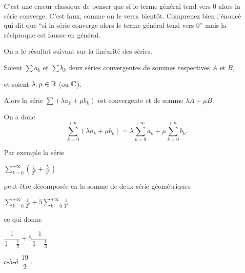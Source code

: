 \change
C'est une erreur classique de penser que si le terme
général tend vers $0$ alors la série converge. C'est faux, comme on le verra
bientôt. Comprenez bien l'énoncé qui dit que ``si la série converge alors
le terme général tend vers $0$'' mais la réciproque est fausse en général.


\diapo

On a le résultat suivant sur la linéarité des séries.

Soient $\sum a_k$ et $\sum b_k$ deux séries convergentes de sommes respectives $A$ et $B$, 

et soient $\lambda, \mu \in \mathbb{R}$ (ou $\mathbb{C}$).

\change
Alors la série $\sum (\lambda a_k+\mu b_k)$ est convergente et de somme $\lambda A+\mu B$. 
 
\change
On a donc
$$\sum_{k=0}^{+\infty} (\lambda a_k+\mu b_k) = 
 \lambda \sum_{k=0}^{+\infty} a_k+ \mu \sum_{k=0}^{+\infty} b_k.$$

\change
Par exemple la série

$
\displaystyle\sum_{k=0}^{+\infty} \left(\frac{1}{2^k}+\frac{5}{3^k}\right)
$

\change
peut être décomposée en la somme de deux série géométriques

$ 
\displaystyle\sum_{k=0}^{+\infty} \frac{1}{2^k}+
5\sum_{k=0}^{+\infty} \frac{1}{3^k}$

\change
ce qui donne

$
\dfrac{1}{1-\frac{1}{2}}+5\dfrac{1}{1-\frac{1}{3}} 
$

\change
c-à-d
$
\dfrac{19}{2}\;.
$

%  
% 
% 

